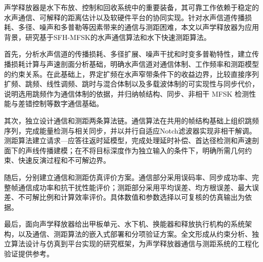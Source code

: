 \begin{cabstract}
  声学释放器是水下布放、控制和回收系统中的重要装备，其可靠工作依赖于稳定的水声通信、可解释的距离估计以及软硬件平台的协同实现。针对水声信道传播损耗、多径、噪声和多普勒等因素带来的通信与测距困难，本文以声学释放器为应用背景，研究基于SFH-MFSK的水声通信算法和水下快速测距算法。

  首先，分析水声信道的传播损耗、多径扩展、噪声干扰和时变多普勒特性，建立传播损耗计算与声速剖面分析基础，明确水声信道对通信体制、工作频率和测距模型的约束关系。在此基础上，界定扩频在水声窄带条件下的收益边界，比较直接序列扩频、跳频、线性调频、跳时与混合体制以及多载波体制的可实现性与同步代价，说明选用跳频作为通信体制的依据，并归纳帧结构、同步、非相干 MFSK 检测性能与差错控制等数字通信基础。

  其次，独立设计通信和测距两条算法链。通信算法在共用的帧结构基础上组织跳频序列，完成能量检测与相关同步，并以并行自适应Notch滤波器实现非相干解调。测距算法建立请求—应答往返时延模型，完成处理延时补偿、首达径检测和声速剖面下的声线传播建模；在不将目标深度作为独立输入的条件下，明确所需几何约束、快速反演过程和不可解边界。

  随后，分别建立通信和测距仿真评价方案。通信部分采用误码率、同步成功率、完整帧通信成功率和抗干扰性能评价；测距部分采用平均误差、均方根误差、最大误差、不可解比例和计算效率评价。具体数值和参数选择以可复核的仿真输出为依据。

  最后，面向声学释放器给出甲板单元、水下机、换能器和释放执行机构的系统架构，以及通信、测距算法的嵌入式部署和分项验证方案。全文形成从约束分析、独立算法设计与仿真到平台实现的研究框架，为声学释放器通信与测距系统的工程化验证提供参考。
\end{cabstract}

